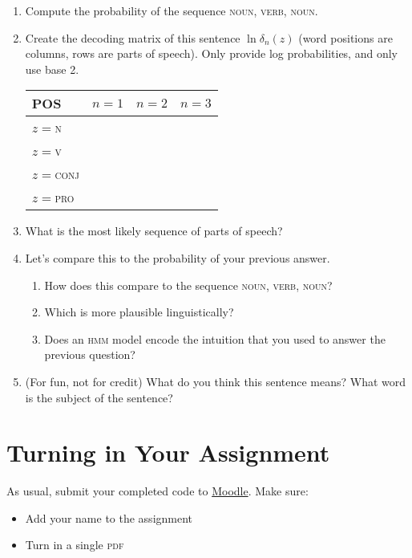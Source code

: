 \documentclass[11pt]{article}
\begin{document}
\begin{enumerate}

\item Compute the probability of the sequence \textsc{noun}, \textsc{verb}, \textsc{noun}.  

\item Create the decoding matrix of this sentence $\ln \delta_{n}(z)$ (word positions are columns, rows are parts of speech).  Only provide log probabilities, and only use base 2.

\begin{center}
\begin{tabular}{l|ccc}
	POS & $n=1$ & $n=2$ & $n=3$ \\
	\hline
	$z=$\textsc{n} & & & \\
	$z=$\textsc{v} & & & \\
	$z=$\textsc{conj} & & & \\	
	$z=$\textsc{pro} & & & \\	
	\hline
\end{tabular}
\end{center}

\item What is the most likely sequence of parts of speech?

\item Let's compare this to the probability of your previous answer.
	\begin{enumerate}
		\item How does this compare to the sequence \textsc{noun}, \textsc{verb}, \textsc{noun}?
		\item Which is more plausible linguistically?
		\item Does an \textsc{hmm} model encode the intuition that you used to answer the previous question?
	\end{enumerate}
\item (For fun, not for credit) What do you think this sentence means?  What word is the subject of the sentence?

\end{enumerate}


\section*{Turning in Your Assignment}

As usual, submit your completed code to
\href{https://moodle.cs.colorado.edu/course/view.php?id=161}{Moodle}.
Make sure:
\begin{itemize}
  \item Add your name to the assignment
  \item Turn in a single \textsc{pdf} 
\end{itemize}
\end{document}
